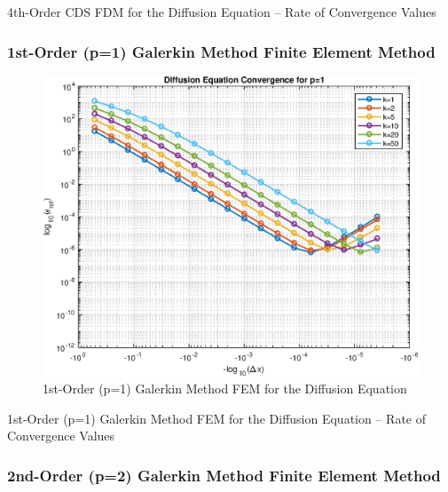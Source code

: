 \documentclass[10pt]{article}		%
\numberwithin{equation}{section}
\begin{document}
\begin{table}[H]
	
	\caption{4th-Order CDS FDM for the Diffusion Equation -- Rate of Convergence Values}	
\end{table}

\newpage

\subsubsection{1st-Order (p=1) Galerkin Method Finite Element Method}

\begin{figure}[H]
	\begin{center}
		\includegraphics[width = 0.5\linewidth]{convergence_diffusion_p_1}
		\caption{ 1st-Order (p=1) Galerkin Method FEM for the Diffusion Equation}	
	\end{center}
\end{figure}

\begin{table}[H]
	
	\caption{ 1st-Order (p=1) Galerkin Method FEM for the Diffusion Equation -- Rate of Convergence Values}	
\end{table}

\newpage

\subsubsection{2nd-Order (p=2) Galerkin Method Finite Element Method}

%
%	
\end{document}
